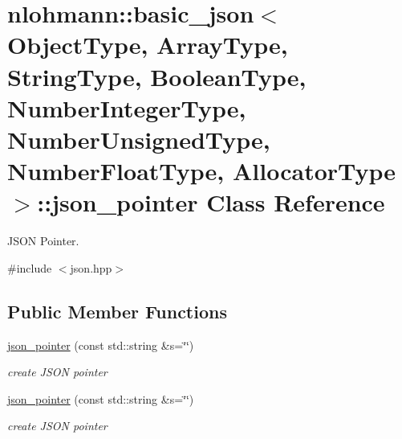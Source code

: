 \hypertarget{classnlohmann_1_1basic__json_1_1json__pointer}{\section{nlohmann\-:\-:basic\-\_\-json$<$ Object\-Type, Array\-Type, String\-Type, Boolean\-Type, Number\-Integer\-Type, Number\-Unsigned\-Type, Number\-Float\-Type, Allocator\-Type $>$\-:\-:json\-\_\-pointer Class Reference}
\label{classnlohmann_1_1basic__json_1_1json__pointer}
}


J\-S\-O\-N Pointer.  




{\ttfamily \#include $<$json.\-hpp$>$}

\subsection*{Public Member Functions}
\begin{DoxyCompactItemize}
\item 
\hyperlink{classnlohmann_1_1basic__json_1_1json__pointer_ae12db117a2742d826465080979d7c835_ae12db117a2742d826465080979d7c835}{json\-\_\-pointer} (const std\-::string \&s=\char`\"{}\char`\"{})
\begin{DoxyCompactList}\small\item\em create J\-S\-O\-N pointer \end{DoxyCompactList}\item 
\hyperlink{classnlohmann_1_1basic__json_1_1json__pointer_ae12db117a2742d826465080979d7c835_ae12db117a2742d826465080979d7c835}{json\-\_\-pointer} (const std\-::string \&s=\char`\"{}\char`\"{})
\begin{DoxyCompactList}\small\item\em create J\-S\-O\-N pointer \end{DoxyCompactList}\end{DoxyCompactItemize}

